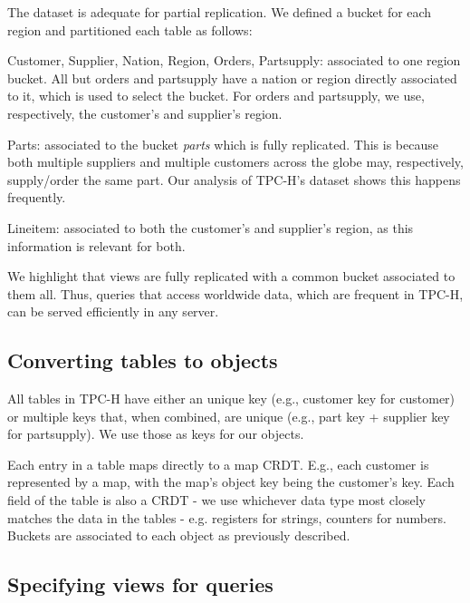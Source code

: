 \documentclass[sigconf, nonacm]{acmart}
\begin{document}
The dataset is adequate for partial replication.
We defined a bucket for each region and partitioned each table as follows:

\begin{compactitem}
	\item Customer, Supplier, Nation, Region, Orders, Partsupply: associated to one region bucket. 
	All but orders and partsupply have a nation or region directly associated to it, which is used to select the bucket.
	For orders and partsupply, we use, respectively, the customer's and supplier's region.
	\item Parts: associated to the bucket \emph{parts} which is fully replicated.
	This is because both multiple suppliers and multiple customers across the globe may, respectively, supply/order the same part.
	Our analysis of TPC-H's dataset shows this happens frequently.
	\item Lineitem: associated to both the customer's and supplier's region, as this information is relevant for both.
\end{compactitem}

We highlight that views are fully replicated with a common bucket associated to them all.
Thus, queries that access worldwide data, which are frequent in TPC-H, can  be served efficiently in any server.

\subsection{Converting tables to objects}
\label{subsec:tables_to_objects}

All tables in TPC-H have either an unique key (e.g., customer key for customer) or multiple keys that, when combined, are unique (e.g., part key + supplier key for partsupply).
We use those as keys for our objects.	%

Each entry in a table maps directly to a map CRDT.
E.g., each customer is represented by a map, with the map's object key being the customer's key.
Each field of the table is also a CRDT - we use whichever data type most closely matches the data in the tables - e.g. registers for strings, counters for numbers.
Buckets are associated to each object as previously described.

\subsection{Specifying views for queries}
\label{subsec:views_for_queries}
\end{document}
